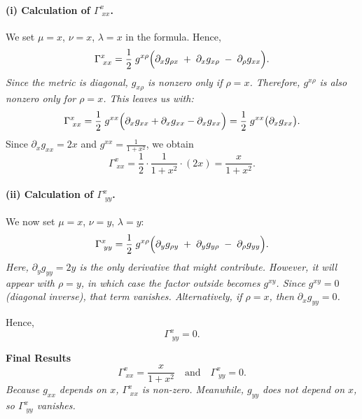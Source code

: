     \bigskip

    \paragraph{(i) Calculation of \(\Gamma^x_{\;xx}\).}

    \noindent
    We set \(\mu = x\), \(\nu = x\), \(\lambda = x\) in the formula. Hence,
    \[
        \Gamma^x_{\;xx}
        =
        \frac{1}{2}\;g^{x\rho}
        \Bigl(
        \partial_x g_{\rho x}
        \;+\;
        \partial_x g_{x \rho}
        \;-\;
        \partial_\rho g_{xx}
        \Bigr).
    \]
    \emph{Since the metric is diagonal, \(g_{x\rho}\) is nonzero only if \(\rho = x\). Therefore, \(g^{x\rho}\) is also nonzero only for \(\rho = x\). This leaves us with:}
    \[
        \Gamma^x_{\;xx}
        =
        \frac12 \; g^{xx}
        \Bigl(
        \partial_x g_{xx}
        + \partial_x g_{xx}
        - \partial_x g_{xx}
        \Bigr)
        =
        \frac12 \; g^{xx}
        \bigl(\partial_x g_{xx}\bigr).
    \]
    Since \(\partial_x g_{xx} = 2x\) and \(g^{xx} = \tfrac{1}{1 + x^2}\), we obtain
    \[
        \Gamma^x_{\;xx}
        =
        \frac12 \cdot \frac{1}{1 + x^2} \cdot (2x)
        =
        \frac{x}{1 + x^2}.
    \]

    \bigskip

    \paragraph{(ii) Calculation of \(\Gamma^x_{\;yy}\).}

    \noindent
    We now set \(\mu = x\), \(\nu = y\), \(\lambda = y\):
    \[
        \Gamma^x_{\;yy}
        =
        \frac{1}{2}\;g^{x\rho}
        \Bigl(
        \partial_y g_{\rho y}
        \;+\;
        \partial_y g_{y \rho}
        \;-\;
        \partial_\rho g_{yy}
        \Bigr).
    \]
    \emph{Here, \(\partial_y g_{yy} = 2y\) is the only derivative that might contribute. However, it will appear with \(\rho = y\), in which case the factor outside becomes \(g^{xy}\). Since \(g^{xy} = 0\) (diagonal inverse), that term vanishes. Alternatively, if \(\rho = x\), then \(\partial_x g_{yy} = 0\).}

    Hence,
    \[
        \Gamma^x_{\;yy} = 0.
    \]

    \bigskip

    \noindent
    \textbf{Final Results}
    \[
        \boxed{
            \Gamma^x_{\;xx} = \frac{x}{1 + x^2}
            \quad\text{and}\quad
            \Gamma^x_{\;yy} = 0.
        }
    \]
    \emph{Because \(g_{xx}\) depends on \(x\), \(\Gamma^x_{\;xx}\) is non-zero. Meanwhile, \(g_{yy}\) does not depend on \(x\), so \(\Gamma^x_{\;yy}\) vanishes.}

